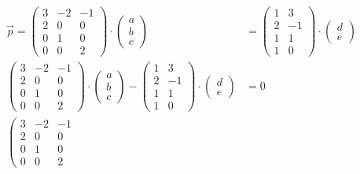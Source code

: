 \documentclass[12pt]{article}
\begin{document}
\begin{enumerate}
    \begin{align*}
      \vec{p} = \left(\begin{array}{ccc}
        3 & -2 & -1 \\
        2 & 0 & 0 \\
        0 & 1 & 0 \\
        0 & 0 & 2
      \end{array}\right) \cdot \left(\begin{array}{c}
        a\\b\\c
      \end{array}\right)
      &= \left(\begin{array}{ccc}
        1 & 3 \\
        2 & -1 \\
        1 & 1 \\
        1 & 0
      \end{array}\right) \cdot \left(\begin{array}{c}
        d\\e
      \end{array}\right) \\
      \left(\begin{array}{ccc}
        3 & -2 & -1 \\
        2 & 0 & 0 \\
        0 & 1 & 0 \\
        0 & 0 & 2
      \end{array}\right) \cdot \left(\begin{array}{c}
        a\\b\\c
      \end{array}\right) -
      \left(\begin{array}{ccc}
        1 & 3 \\
        2 & -1 \\
        1 & 1 \\
        1 & 0
      \end{array}\right) \cdot \left(\begin{array}{c}
        d\\e
      \end{array}\right) 
      &= 0 \\
      \left(\begin{array}{ccc}
        3 & -2 & -1 \\
        2 & 0 & 0 \\
        0 & 1 & 0 \\
        0 & 0 & 2

\end{array}
\end{align*}
\end{enumerate}
\end{document}

